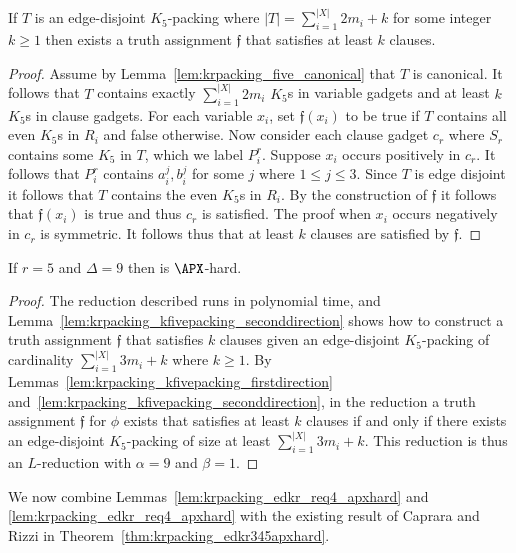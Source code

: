 \begin{lem}
\label{lem:krpacking_kfivepacking_seconddirection}
If $T$ is an edge-disjoint $K_5$-packing where $|T| = \sum_{i=1}^{|X|} 2 m_i + k$ for some integer $k\geq 1$ then exists a truth assignment $\mathfrak{f}$ that satisfies at least $k$ clauses.
\end{lem}
\begin{proof}
Assume by Lemma~\ref{lem:krpacking_five_canonical} that $T$ is canonical. It follows that $T$ contains exactly $\sum_{i=1}^{|X|} 2 m_i$ $K_5$s in variable gadgets and at least $k$ $K_5$s in clause gadgets. For each variable $x_i$, set $\mathfrak{f}(x_i)$ to be true if $T$ contains all even $K_5$s in $R_i$ and false otherwise. Now consider each clause gadget $c_r$ where $S_r$ contains some $K_5$ in $T$, which we label $P_i^r$. Suppose $x_i$ occurs positively in $c_r$. It follows that $P_i^r$ contains $a_i^j, b_i^j$ for some $j$ where $1\leq j\leq 3$. Since $T$ is edge disjoint it follows that $T$ contains the even $K_5$s in $R_i$. By the construction of $\mathfrak{f}$ it follows that $\mathfrak{f}(x_i)$ is true and thus $c_r$ is satisfied. The proof when $x_i$ occurs negatively in $c_r$ is symmetric. It follows thus that at least $k$ clauses are satisfied by $\mathfrak{f}$.
\end{proof}

\begin{lem}
\label{lem:krpacking_edkr_req5_apxhard}
If $r=5$ and $\Delta=9$ then \edkr is $\APX$-hard.
\end{lem}
\begin{proof}
The reduction described runs in polynomial time, and Lemma~\ref{lem:krpacking_kfivepacking_seconddirection} shows how to construct a truth assignment $\mathfrak{f}$ that satisfies $k$ clauses given an edge-disjoint $K_5$-packing of cardinality $\sum_{i=1}^{|X|} 3 m_i + k$ where $k \geq 1$. By Lemmas~\ref{lem:krpacking_kfivepacking_firstdirection} and~\ref{lem:krpacking_kfivepacking_seconddirection}, in the reduction a truth assignment $\mathfrak{f}$ for $\phi$ exists that satisfies at least $k$ clauses if and only if there exists an edge-disjoint $K_5$-packing of size at least $\sum_{i=1}^{|X|} 3 m_i + k$. This reduction is thus an $L$-reduction with $\alpha=9$ and $\beta=1$.
\end{proof}

We now combine Lemmas~\ref{lem:krpacking_edkr_req4_apxhard} and \ref{lem:krpacking_edkr_req4_apxhard} with the existing result of Caprara and Rizzi \cite{caprara_packing_2002} in Theorem~\ref{thm:krpacking_edkr345apxhard}.


